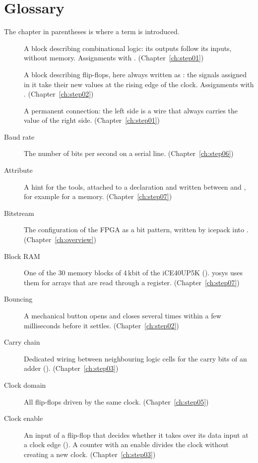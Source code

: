 \chapter{Glossary}
\label{app:glossary}

The chapter in parentheses is where a term is introduced.

\begin{description}
\item[] A block describing combinational logic: its outputs
  follow its inputs, without memory. Assignments with \cc{=}.
  (Chapter~\ref{ch:step01})
\item[] A block describing flip-flops, here always written as
  : the signals assigned in it take their new
  values at the rising edge of the clock. Assignments with \cc{<=}.
  (Chapter~\ref{ch:step02})
\item[] A permanent connection: the left side is a wire that always
  carries the value of the right side. (Chapter~\ref{ch:step01})
\item[Baud rate] The number of bits per second on a serial line.
  (Chapter~\ref{ch:step06})
\item[Attribute] A hint for the tools, attached to a declaration and
  written between \cc{(*} and \cc{*)}, for example 
  for a memory.
  (Chapter~\ref{ch:step07})
\item[Bitstream] The configuration of the FPGA as a bit pattern, written by
  icepack into . (Chapter~\ref{ch:overview})
\item[Block RAM] One of the 30 memory blocks of 4\,kbit of the iCE40UP5K
  (). yosys uses them for arrays that are read through a
  register. (Chapter~\ref{ch:step07})
\item[Bouncing] A mechanical button opens and closes several times within a
  few milliseconds before it settles. (Chapter~\ref{ch:step02})
\item[Carry chain] Dedicated wiring between neighbouring logic cells for the
  carry bits of an adder (). (Chapter~\ref{ch:step03})
\item[Clock domain] All flip-flops driven by the same clock.
  (Chapter~\ref{ch:step05})
\item[Clock enable] An input of a flip-flop that decides whether it takes
  over its data input at a clock edge (). A counter with an enable
  divides the clock without creating a new clock. (Chapter~\ref{ch:step03})

\end{description}
